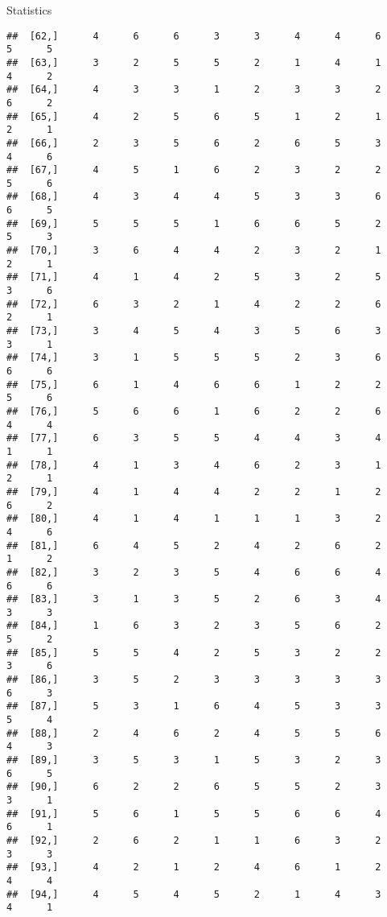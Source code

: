 \documentclass[
  ignorenonframetext,
]{beamer}
\begin{document}
\begin{frame}[fragile]{Statistics}
\begin{verbatim}
##  [62,]      4      6      6      3      3      4      4      6      5      5
##  [63,]      3      2      5      5      2      1      4      1      4      2
##  [64,]      4      3      3      1      2      3      3      2      6      2
##  [65,]      4      2      5      6      5      1      2      1      2      1
##  [66,]      2      3      5      6      2      6      5      3      4      6
##  [67,]      4      5      1      6      2      3      2      2      5      6
##  [68,]      4      3      4      4      5      3      3      6      6      5
##  [69,]      5      5      5      1      6      6      5      2      5      3
##  [70,]      3      6      4      4      2      3      2      1      2      1
##  [71,]      4      1      4      2      5      3      2      5      3      6
##  [72,]      6      3      2      1      4      2      2      6      2      1
##  [73,]      3      4      5      4      3      5      6      3      3      1
##  [74,]      3      1      5      5      5      2      3      6      6      6
##  [75,]      6      1      4      6      6      1      2      2      5      6
##  [76,]      5      6      6      1      6      2      2      6      4      4
##  [77,]      6      3      5      5      4      4      3      4      1      1
##  [78,]      4      1      3      4      6      2      3      1      2      1
##  [79,]      4      1      4      4      2      2      1      2      6      2
##  [80,]      4      1      4      1      1      1      3      2      4      6
##  [81,]      6      4      5      2      4      2      6      2      1      2
##  [82,]      3      2      3      5      4      6      6      4      6      6
##  [83,]      3      1      3      5      2      6      3      4      3      3
##  [84,]      1      6      3      2      3      5      6      2      5      2
##  [85,]      5      5      4      2      5      3      2      2      3      6
##  [86,]      3      5      2      3      3      3      3      3      6      3
##  [87,]      5      3      1      6      4      5      3      3      5      4
##  [88,]      2      4      6      2      4      5      5      6      4      3
##  [89,]      3      5      3      1      5      3      2      3      6      5
##  [90,]      6      2      2      6      5      5      2      3      3      1
##  [91,]      5      6      1      5      5      6      6      4      6      1
##  [92,]      2      6      2      1      1      6      3      2      3      3
##  [93,]      4      2      1      2      4      6      1      2      4      4
##  [94,]      4      5      4      5      2      1      4      3      4      1

\end{verbatim}
\end{frame}
\end{document}
